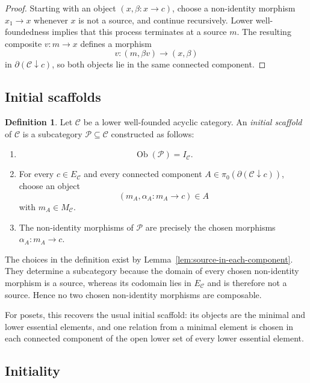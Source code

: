 \documentclass[12pt]{amsart}
\theoremstyle{definition}
\newtheorem{definition}[teo]{Definition}
\theoremstyle{remark}
\numberwithin{figure}{section}%
\newcommand{\CC}{\mathcal{C}}
\begin{document}
\begin{proof}
Starting with an object \((x,\beta\colon x\to c)\), choose a
non-identity morphism \(x_1\to x\) whenever \(x\) is not a source, and
continue recursively. Lower well-foundedness implies that this process
terminates at a source \(m\). The resulting composite \(v\colon m\to x\)
defines a morphism
\[
v\colon(m,\beta v)\longrightarrow(x,\beta)
\]
in \(\partial(\CC\downarrow c)\), so both objects lie in the same connected component.
\end{proof}

\subsection{Initial scaffolds}

\begin{definition}\label{def:categorical-initial-scaffold}
Let \(\CC\) be a lower well-founded acyclic category. An
\emph{initial scaffold} of \(\CC\) is a subcategory
\(\mathcal P\subseteq\CC\) constructed as follows:

\begin{enumerate}
    \item
    \[
    \operatorname{Ob}(\mathcal P)=I_\CC.
    \]

    \item For every \(c\in E_\CC\) and every connected component
    \(A\in\pi_0(\partial(\CC\downarrow c))\), choose an object
    \[
    (m_A,\alpha_A\colon m_A\to c)\in A
    \]
    with \(m_A\in M_\CC\).

    \item The non-identity morphisms of \(\mathcal P\) are precisely the
    chosen morphisms \(\alpha_A\colon m_A\to c\).
\end{enumerate}
\end{definition}

The choices in the definition exist by
Lemma~\ref{lem:source-in-each-component}. They determine a subcategory
because the domain of every chosen non-identity morphism is a source,
whereas its codomain lies in \(E_\CC\) and is therefore not a source.
Hence no two chosen non-identity morphisms are composable.

For posets, this recovers the usual initial scaffold: its objects are the
minimal and lower essential elements, and one relation from a minimal
element is chosen in each connected component of the open lower set of
every lower essential element.

\subsection{Initiality}
\end{document}
